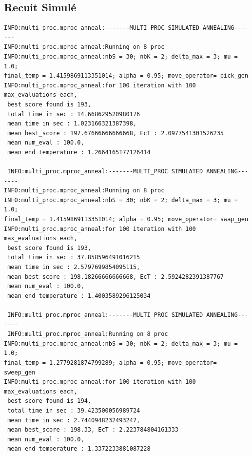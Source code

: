 \documentclass[a4paper]{article}
\begin{document}
	\subsection{Recuit Simulé}
		\begin{verbatim}
INFO:multi_proc.mproc_anneal:-------MULTI_PROC SIMULATED ANNEALING-------
INFO:multi_proc.mproc_anneal:Running on 8 proc
INFO:multi_proc.mproc_anneal:nbS = 30; nbK = 2; delta_max = 3; mu = 1.0; 
final_temp = 1.4159869113351014; alpha = 0.95; move_operator= pick_gen
INFO:multi_proc.mproc_anneal:for 100 iteration with 100 max_evaluations each, 
 best score found is 193,
 total time in sec : 14.668629520980176
 mean time in sec : 1.023166321387398,
 mean best_score : 197.67666666666668, EcT : 2.0977541301526235
 mean num_eval : 100.0,
 mean end temperature : 1.2664165177126414

 INFO:multi_proc.mproc_anneal:-------MULTI_PROC SIMULATED ANNEALING-------
INFO:multi_proc.mproc_anneal:Running on 8 proc
INFO:multi_proc.mproc_anneal:nbS = 30; nbK = 2; delta_max = 3; mu = 1.0; 
final_temp = 1.4159869113351014; alpha = 0.95; move_operator= swap_gen
INFO:multi_proc.mproc_anneal:for 100 iteration with 100 max_evaluations each, 
 best score found is 193,
 total time in sec : 37.858596491016215
 mean time in sec : 2.5797699854095115,
 mean best_score : 198.18266666666668, EcT : 2.5924282391387767
 mean num_eval : 100.0,
 mean end temperature : 1.4003589296125034

 INFO:multi_proc.mproc_anneal:-------MULTI_PROC SIMULATED ANNEALING-------
 INFO:multi_proc.mproc_anneal:Running on 8 proc
INFO:multi_proc.mproc_anneal:nbS = 30; nbK = 2; delta_max = 3; mu = 1.0; 
final_temp = 1.2779281874799289; alpha = 0.95; move_operator= sweep_gen
INFO:multi_proc.mproc_anneal:for 100 iteration with 100 max_evaluations each, 
 best score found is 194,
 total time in sec : 39.423500056989724
 mean time in sec : 2.7440948232493247,
 mean best_score : 198.33, EcT : 2.223784804161333
 mean num_eval : 100.0,
 mean end temperature : 1.3372233881087228
		\end{verbatim}
\end{document}
